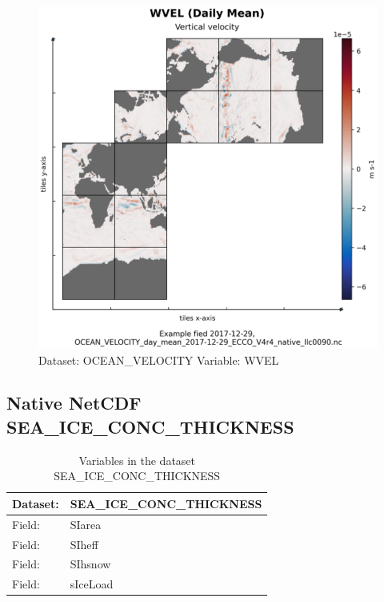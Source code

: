 \begin{figure}[H]
\centering
\includegraphics[scale=0.55]{../images/plots/native_plots/Ocean_Velocity/WVEL.png}
\caption{Dataset: OCEAN\_VELOCITY Variable: WVEL}
\label{tab:table-OCEAN_VELOCITY_WVEL-Plot}
\end{figure}
\pagebreak
\subsection{Native NetCDF SEA\_ICE\_CONC\_THICKNESS}
\newp
\begin{longtable}{|p{}|p{}|}
\caption{Variables in the dataset SEA\_ICE\_CONC\_THICKNESS}
\label{tab:table-SEA_ICE_CONC_THICKNESS-fields} \\ 
\hline \endhead \hline \endfoot
\rowcolor{lightgray} \textbf{Dataset:} & \textbf{SEA\_ICE\_CONC\_THICKNESS} \\ \hline
Field: &SIarea \\ \hline
Field: &SIheff \\ \hline
Field: &SIhsnow \\ \hline
Field: &sIceLoad \\ \hline
\end{longtable}

\pagebreak
